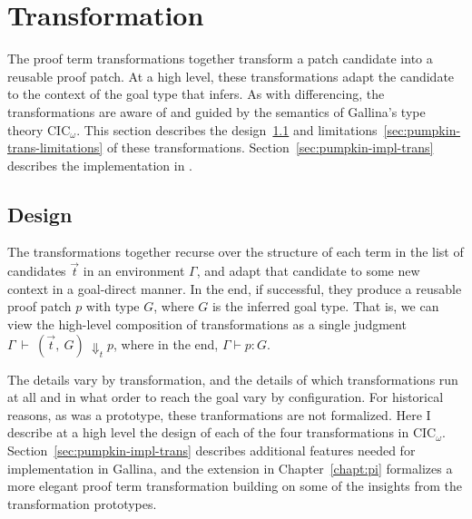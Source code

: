 \section{Transformation}
\label{sec:pumpkin-trans}

The proof term transformations together transform a patch candidate into a reusable proof patch.
At a high level, these transformations adapt the candidate to the context of the goal type that \sysname infers.
As with differencing, the transformations are aware of and guided by the semantics of Gallina's type theory CIC$_{\omega}$.
This section describes the design~\ref{sec:pumpkin-trans-design} and limitations~\ref{sec:pumpkin-trans-limitations} of these transformations.
Section~\ref{sec:pumpkin-impl-trans} describes the implementation in \sysname.


\subsection{Design}
\label{sec:pumpkin-trans-design}

The transformations together recurse over the structure of each term in the list of candidates $\vec{t}$ in an environment $\Gamma$,
and adapt that candidate to some new context in a goal-direct manner.
In the end, if successful, they produce a reusable proof patch $p$ with type $G$, where $G$ is the inferred goal type.
That is, we can view the high-level composition of transformations as a single judgment
$\Gamma\ \vdash\ (\vec{t},\ G)\ \Downarrow_{t} p$, where in the end, $\Gamma \vdash p : G$. 

The details vary by transformation,
and the details of which transformations run at all and in what order to reach the goal vary by configuration.
For historical reasons, as \sysname was a prototype, these tranformations are not formalized. %
Here I describe at a high level the design of each of the four transformations in CIC${_\omega}$.
Section~\ref{sec:pumpkin-impl-trans} describes additional features needed for implementation in Gallina,
and the \toolnamec extension in Chapter~\ref{chapt:pi} formalizes a more elegant proof term transformation building on some of the insights from the \sysname transformation prototypes.


